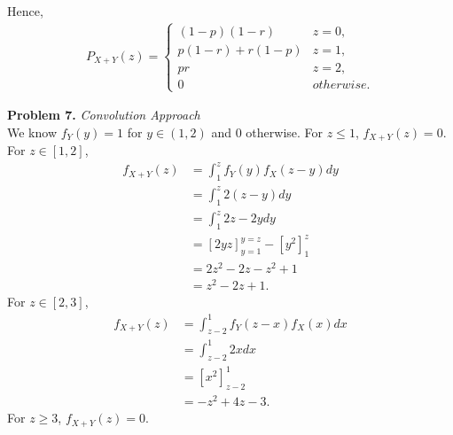 \documentclass{article}
\begin{document}
Hence,
\begin{align}
    P_{X+Y}(z) = 
    \begin{cases}
        (1-p)(1-r) & z = 0, \\
        p(1-r)+r(1-p) & z = 1, \\
        pr & z = 2, \\
        0 & otherwise.
    \end{cases}
\end{align}
\bigbreak

\textbf{Problem 7.}
\emph{Convolution Approach} \\
We know $f_Y(y)=1$ for $y \in (1,2)$ and 0 otherwise. For $z \le 1$, $f_{X+Y}(z)=0$.
For $z \in [1,2]$,
\begin{align}
    f_{X+Y}(z) & = \int_{1}^{z}f_Y(y)f_X(z-y)dy \\ 
    & = \int_{1}^{z}2(z-y)dy \\
    & = \int_{1}^{z}2z - 2y dy \\
    & = \left[2yz\right]_{y=1}^{y=z}-\left[y^2\right]_1^z \\
    & = 2z^2-2z-z^2+1 \\
    & = z^2-2z+1.
\end{align}
For $z \in [2,3]$,
\begin{align}
    f_{X+Y}(z) & = \int_{z-2}^{1}f_Y(z-x)f_X(x)dx \\
    & = \int_{z-2}^{1}2xdx \\
    & = \left[x^2\right]_{z-2}^1 \\
    & = -z^2+4z-3.
\end{align}
For $z\ge 3$, $f_{X+Y}(z)=0$.
\bigbreak
\end{document}

